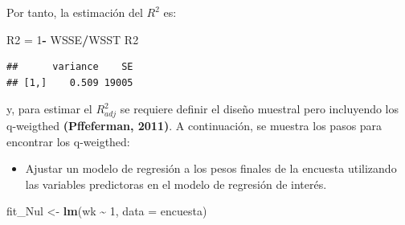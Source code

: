 \documentclass[
  12pt,
]{book}
\newenvironment{Shaded}{\begin{snugshade}}{\end{snugshade}}
\newcommand{\AttributeTok}[1]{\textcolor[rgb]{0.13,0.29,0.53}{#1}}
\newcommand{\DecValTok}[1]{\textcolor[rgb]{0.00,0.00,0.81}{#1}}
\newcommand{\FunctionTok}[1]{\textcolor[rgb]{0.13,0.29,0.53}{\textbf{#1}}}
\newcommand{\NormalTok}[1]{#1}
\newcommand{\OtherTok}[1]{\textcolor[rgb]{0.56,0.35,0.01}{#1}}
\newcommand{\SpecialCharTok}[1]{\textcolor[rgb]{0.81,0.36,0.00}{\textbf{#1}}}
\providecommand{\tightlist}{%
  \setlength{\itemsep}{0pt}\setlength{\parskip}{0pt}}
\begin{document}
\begin{Shaded}
\end{Shaded}

Por tanto, la estimación del \(R^{2}\) es:

\begin{Shaded}
\begin{Highlighting}[]
\NormalTok{R2 }\OtherTok{=} \DecValTok{1}\SpecialCharTok{{-}}\NormalTok{ WSSE}\SpecialCharTok{/}\NormalTok{WSST}
\NormalTok{R2}
\end{Highlighting}
\end{Shaded}

\begin{verbatim}
##      variance    SE
## [1,]    0.509 19005
\end{verbatim}

y, para estimar el \(R_{adj}^{2}\) se requiere definir el diseño muestral pero incluyendo los q-weigthed \textbf{(Pffeferman, 2011)}. A continuación, se muestra los pasos para encontrar los q-weigthed:

\begin{itemize}
\tightlist
\item
  Ajustar un modelo de regresión a los pesos finales de la encuesta utilizando las variables predictoras en el modelo de regresión de interés.
\end{itemize}

\begin{Shaded}
\begin{Highlighting}[]
\NormalTok{fit\_Nul }\OtherTok{\textless{}{-}} \FunctionTok{lm}\NormalTok{(wk }\SpecialCharTok{\textasciitilde{}} \DecValTok{1}\NormalTok{, }\AttributeTok{data =}\NormalTok{ encuesta)}
\end{Highlighting}
\end{Shaded}
\end{document}
